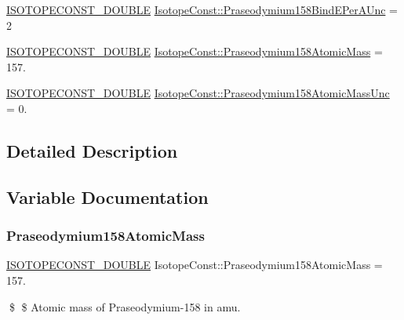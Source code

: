 \begin{DoxyCompactItemize}
\item 
\mbox{\hyperlink{group___isotope_const-_macros_ga8f45a7272ce02c0b4c65c44636ed719a}{I\+S\+O\+T\+O\+P\+E\+C\+O\+N\+S\+T\+\_\+\+D\+O\+U\+B\+LE}} \mbox{\hyperlink{group___isotope_const-_praseodymium-_pr158_gac2b1e20cb97d482188acdd5f0bf3426a}{Isotope\+Const\+::\+Praseodymium158\+Bind\+E\+Per\+A\+Unc}} = 2
\item 
\mbox{\hyperlink{group___isotope_const-_macros_ga8f45a7272ce02c0b4c65c44636ed719a}{I\+S\+O\+T\+O\+P\+E\+C\+O\+N\+S\+T\+\_\+\+D\+O\+U\+B\+LE}} \mbox{\hyperlink{group___isotope_const-_praseodymium-_pr158_ga098d293eb4e1732c7908184f53b14422}{Isotope\+Const\+::\+Praseodymium158\+Atomic\+Mass}} = 157.
\item 
\mbox{\hyperlink{group___isotope_const-_macros_ga8f45a7272ce02c0b4c65c44636ed719a}{I\+S\+O\+T\+O\+P\+E\+C\+O\+N\+S\+T\+\_\+\+D\+O\+U\+B\+LE}} \mbox{\hyperlink{group___isotope_const-_praseodymium-_pr158_ga680411c3f671489c94f206b7bceec427}{Isotope\+Const\+::\+Praseodymium158\+Atomic\+Mass\+Unc}} = 0.
\end{DoxyCompactItemize}


\subsection{Detailed Description}


\subsection{Variable Documentation}
\mbox{\label{group___isotope_const-_praseodymium-_pr158_ga098d293eb4e1732c7908184f53b14422}} 
\subsubsection{\texorpdfstring{Praseodymium158\+Atomic\+Mass}{Praseodymium158AtomicMass}}
{\footnotesize\ttfamily \mbox{\hyperlink{group___isotope_const-_macros_ga8f45a7272ce02c0b4c65c44636ed719a}{I\+S\+O\+T\+O\+P\+E\+C\+O\+N\+S\+T\+\_\+\+D\+O\+U\+B\+LE}} Isotope\+Const\+::\+Praseodymium158\+Atomic\+Mass = 157.}

\$ \$ Atomic mass of Praseodymium-\/158 in amu. \mbox{\label{group___isotope_const-_praseodymium-_pr158_ga680411c3f671489c94f206b7bceec427}} 
